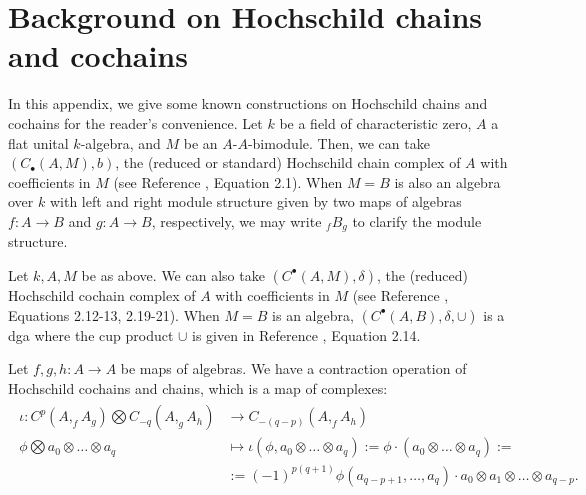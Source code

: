 \chapter{Background on Hochschild chains and cochains}
\label{chap:hochschild}
In this appendix, we give some known 
constructions on Hochschild chains and 
cochains for the reader's convenience. 
%
Let $k$ be a field of characteristic zero, 
$A$ a flat unital $k$-algebra, and $M$ be an 
$A$-$A$-bimodule. Then, we can take 
$(C_\bullet(A,M), b)$, the 
(reduced or standard) Hochschild chain 
complex of $A$ 
with coefficients in $M$ (see Reference 
\cite{T}, Equation 2.1). When $M = B$ is also 
an algebra over $k$ with left and right 
module structure given by two maps of algebras 
$f:A \to B$ and $g:A \to B$, respectively, 
we may write $_fB_g$ to clarify 
the module structure.

Let $k, A, M$ be as above. We can also 
take $(C^\bullet(A,M), \delta)$, the 
(reduced) Hochschild cochain complex of $A$ 
with coefficients in $M$ (see Reference 
\cite{T}, Equations 2.12-13, 2.19-21). When $M=B$ is 
an algebra, $(C^\bullet(A,B), \delta, \cup)$ 
is a dga where the cup product $\cup$ is 
given in Reference \cite{T}, Equation 2.14.

Let $f,g,h:A \to A$ be maps of algebras. 
We have a contraction operation of Hochschild 
cochains and chains, which is a map of complexes:
\begin{align} \label{eq:contraction}
\begin{split}
\iota: C^p(A, _fA_g) \bigotimes C_{-q}(A, _gA_h) 
&\longrightarrow 
C_{-(q-p)}(A, _fA_h) \\
\phi \bigotimes a_0\otimes \dots \otimes a_q 
&\mapsto 
\iota(\phi, a_0\otimes \dots \otimes a_q)
:= \phi \cdot (a_0\otimes \dots \otimes a_q) :=\\
&:=
(-1)^{p(q+1)}
\phi(a_{q-p+1},\dots,a_q)\cdot a_0 
\otimes a_1 \otimes \dots \otimes a_{q-p}.
\end{split}
\end{align}

